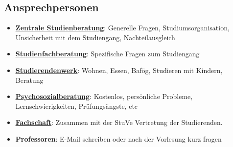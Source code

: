 \documentclass[
	aspectratio=169, 
	10pt 
]{beamer}
\begin{document}
\subsection{Ansprechpersonen}
\begin{frame}{\insertsubsection}
    \begin{itemize}
        \item \underline{\textbf{\href{https://www.uni-ulm.de/studium/studienberatung/zentrale-studienberatung/}{Zentrale Studienberatung}}}: Generelle Fragen, Studiumsorganisation, Unsicherheit mit dem Studiengang, Nachteilausgleich  
        \item \underline{\textbf{\href{https://www.uni-ulm.de/studium/studienberatung/studienfachberatung/}{Studienfachberatung}}}: Spezifische Fragen zum Studiengang 
        \item \underline{\textbf{\href{https://studierendenwerk-ulm.de/}{Studierendenwerk}}}: Wohnen, Essen, Bafög, Studieren mit Kindern, Beratung
        \item \underline{\textbf{\href{https://studierendenwerk-ulm.de/beratung-betreuung/psychosoziale-beratung/}{Psychosozialberatung}}}: Kostenlos, persönliche Probleme, Lernschwierigkeiten, Prüfungsängste, etc
        \item \underline{\textbf{\href{https://stuve.de/fin/aktuelles}{Fachschaft}}}: {Zusammen mit der StuVe Vertretung der Studierenden. }
        \item \textbf{Professoren}: E-Mail schreiben oder nach der Vorlesung kurz fragen
    \end{itemize}
\end{frame}
\end{document}
